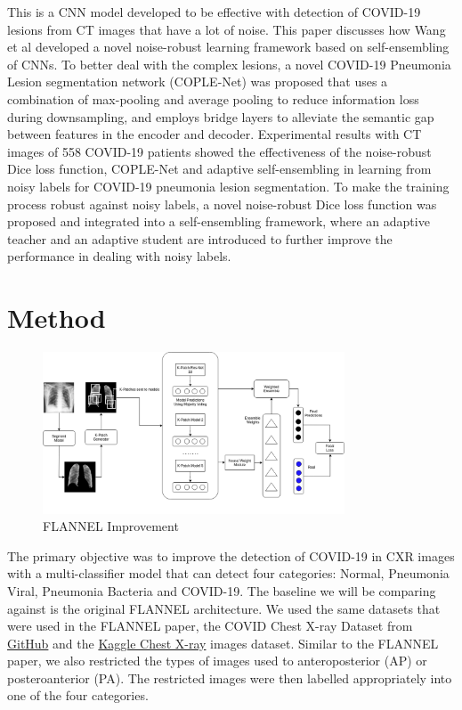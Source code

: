 \documentclass{sigkddExp}
\begin{document}
This is a CNN model \cite{wang2020covidnet} developed to be effective with
detection of COVID-19 lesions from CT images that have a lot of noise. This
paper discusses how Wang et al developed a novel noise-robust learning framework
based on self-ensembling of CNNs.  To better deal with the complex lesions, a
novel COVID-19 Pneumonia Lesion segmentation network (COPLE-Net) was proposed
that uses a combination of max-pooling and average pooling to reduce information
loss during downsampling, and employs bridge layers to alleviate the semantic
gap between features in the encoder and decoder. Experimental results with CT
images of 558 COVID-19 patients showed the effectiveness of the noise-robust
Dice loss function, COPLE-Net and adaptive self-ensembling in learning from
noisy labels for COVID-19 pneumonia lesion segmentation. To make the training
process robust against noisy labels, a novel noise-robust Dice loss function was
proposed and integrated into a self-ensembling framework, where an adaptive
teacher and an adaptive student are introduced to further improve the
performance in dealing with noisy labels.



\section{Method}

\begin{figure}[h]
    \centering
    \includegraphics[width=0.8\textwidth]{../doc/images/FLANNEL-IMPROVED.png}
    \caption{FLANNEL Improvement}
    \label{fig:improve}
\end{figure}

The primary objective was to improve the detection of COVID-19 in CXR images
with a multi-classifier model that can detect four categories: Normal, Pneumonia
Viral, Pneumonia Bacteria and COVID-19. The baseline we will be comparing
against is the original FLANNEL architecture. We used the same datasets that
were used in the FLANNEL paper, the COVID Chest X-ray Dataset
\cite{cohen2020covidProspective} from
\href{https://github.com/ieee8023/covid-chestxray-dataset/tree/78543292f8b01d5e0ed1d0e15dce71949f0657bb}{GitHub} and the
\href{https://www.kaggle.com/paultimothymooney/chest-xray-pneumonia}{Kaggle
    Chest X-ray} images dataset. Similar to the FLANNEL paper, we also restricted
the types of images used to anteroposterior (AP) or posteroanterior (PA). The
restricted images were then labelled appropriately into one of the four
categories.
\end{document}
